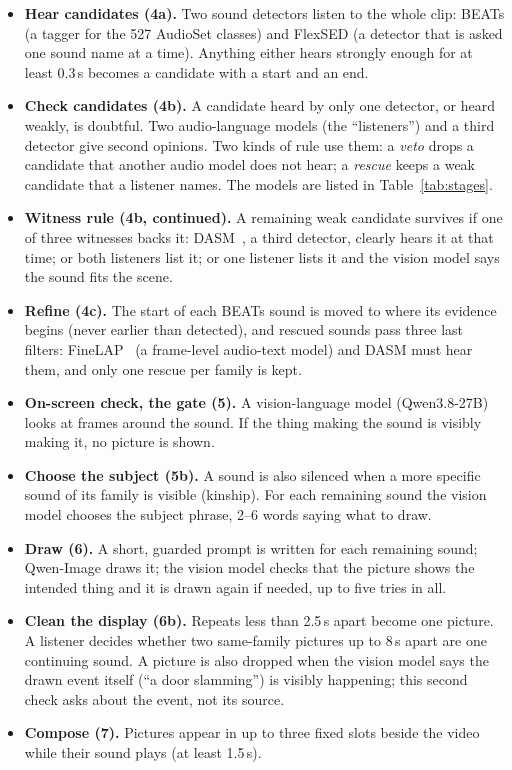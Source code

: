 \begin{itemize}
  \item \textbf{Hear candidates (4a).} Two sound detectors listen to the whole clip: BEATs (a tagger for the 527 AudioSet
        classes) and FlexSED (a detector that is asked one sound name at a time). Anything either hears strongly enough
        for at least 0.3\,s becomes a candidate with a start and an end.
  \item \textbf{Check candidates (4b).} A candidate heard by only one detector, or heard weakly, is doubtful. Two
        audio-language models (the ``listeners'') and a third detector give second opinions. Two kinds of rule use
        them: a \emph{veto} drops a candidate that another audio model does not hear; a \emph{rescue} keeps a weak
        candidate that a listener names. The models are listed in Table~\ref{tab:stages}.
  \item \textbf{Witness rule (4b, continued).} A remaining weak candidate survives if one of three witnesses backs it: DASM~\cite{cai2025dasm}, a third detector, clearly
        hears it at that time; or both listeners list it; or one listener lists it and the vision model says the sound
        fits the scene.
  \item \textbf{Refine (4c).} The start of each BEATs sound is moved to where its evidence begins (never earlier than
        detected), and rescued sounds pass three last filters: FineLAP~\cite{finelapcard} (a frame-level audio-text model) and DASM must hear them, and only one rescue
        per family is kept.
  \item \textbf{On-screen check, the gate (5).} A vision-language model (Qwen3.8-27B) looks at frames around the sound.
        If the thing making the sound is visibly making it, no picture is shown.
  \item \textbf{Choose the subject (5b).} A sound is also silenced when a more specific sound of its family is visible
        (kinship). For each remaining sound the vision model chooses the subject phrase, 2--6 words saying what to
        draw.
  \item \textbf{Draw (6).} A short, guarded prompt is written for each remaining sound; Qwen-Image draws it; the vision
        model checks that the picture shows the intended thing and it is drawn again if needed, up to five tries in all.
  \item \textbf{Clean the display (6b).} Repeats less than 2.5\,s apart become one picture. A listener decides
        whether two same-family pictures up to 8\,s apart are one continuing sound. A picture is also dropped when the
        vision model says the drawn event itself (``a door slamming'') is visibly happening; this second check asks
        about the event, not its source.
  \item \textbf{Compose (7).} Pictures appear in up to three fixed slots beside the video while their sound plays (at least
        1.5\,s).
\end{itemize}


